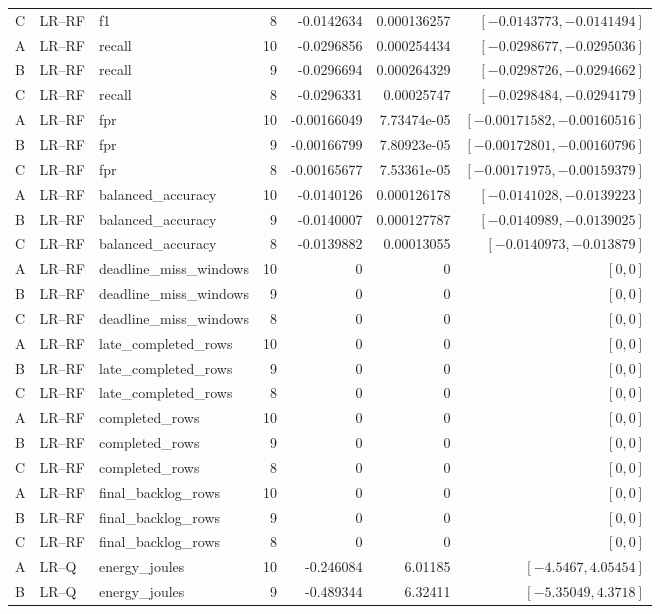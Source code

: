 \begin{longtable}{lllrrrr}
C & LR--RF & f1 & 8 & -0.0142634 & 0.000136257 & $[-0.0143773,-0.0141494]$\\
A & LR--RF & recall & 10 & -0.0296856 & 0.000254434 & $[-0.0298677,-0.0295036]$\\
B & LR--RF & recall & 9 & -0.0296694 & 0.000264329 & $[-0.0298726,-0.0294662]$\\
C & LR--RF & recall & 8 & -0.0296331 & 0.00025747 & $[-0.0298484,-0.0294179]$\\
A & LR--RF & fpr & 10 & -0.00166049 & 7.73474e-05 & $[-0.00171582,-0.00160516]$\\
B & LR--RF & fpr & 9 & -0.00166799 & 7.80923e-05 & $[-0.00172801,-0.00160796]$\\
C & LR--RF & fpr & 8 & -0.00165677 & 7.53361e-05 & $[-0.00171975,-0.00159379]$\\
A & LR--RF & balanced\_accuracy & 10 & -0.0140126 & 0.000126178 & $[-0.0141028,-0.0139223]$\\
B & LR--RF & balanced\_accuracy & 9 & -0.0140007 & 0.000127787 & $[-0.0140989,-0.0139025]$\\
C & LR--RF & balanced\_accuracy & 8 & -0.0139882 & 0.00013055 & $[-0.0140973,-0.013879]$\\
A & LR--RF & deadline\_miss\_windows & 10 & 0 & 0 & $[0,0]$\\
B & LR--RF & deadline\_miss\_windows & 9 & 0 & 0 & $[0,0]$\\
C & LR--RF & deadline\_miss\_windows & 8 & 0 & 0 & $[0,0]$\\
A & LR--RF & late\_completed\_rows & 10 & 0 & 0 & $[0,0]$\\
B & LR--RF & late\_completed\_rows & 9 & 0 & 0 & $[0,0]$\\
C & LR--RF & late\_completed\_rows & 8 & 0 & 0 & $[0,0]$\\
A & LR--RF & completed\_rows & 10 & 0 & 0 & $[0,0]$\\
B & LR--RF & completed\_rows & 9 & 0 & 0 & $[0,0]$\\
C & LR--RF & completed\_rows & 8 & 0 & 0 & $[0,0]$\\
A & LR--RF & final\_backlog\_rows & 10 & 0 & 0 & $[0,0]$\\
B & LR--RF & final\_backlog\_rows & 9 & 0 & 0 & $[0,0]$\\
C & LR--RF & final\_backlog\_rows & 8 & 0 & 0 & $[0,0]$\\
A & LR--Q & energy\_joules & 10 & -0.246084 & 6.01185 & $[-4.5467,4.05454]$\\
B & LR--Q & energy\_joules & 9 & -0.489344 & 6.32411 & $[-5.35049,4.3718]$\\

\end{longtable}
